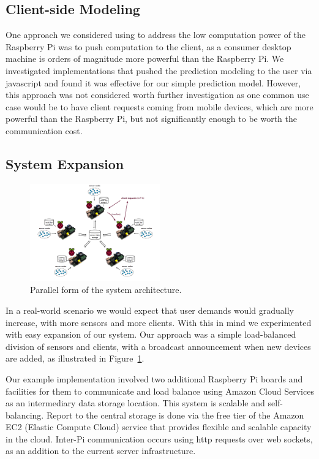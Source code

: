 \documentclass[a4paper]{acm_proc_article-sp}
\begin{document}
\subsection{Client-side Modeling}

One approach we considered using to address the low computation power of the Raspberry Pi was to push computation to the client, as a consumer desktop machine is orders of magnitude more powerful than the Raspberry Pi.  We investigated implementations that pushed the prediction modeling to the user via javascript and found it was effective for our simple prediction model.  However, this approach was not considered worth further investigation as one common use case would be to have client requests coming from mobile devices, which are more powerful than the Raspberry Pi, but not significantly enough to be worth the communication cost.

\subsection{System Expansion}

\begin{figure}
  \centering
      \includegraphics[width=0.5\textwidth]{architecture.png}
  \caption{\label{fig:parallel}Parallel form of the system architecture.}
\end{figure}

In a real-world scenario we would expect that user demands would gradually increase, with more sensors and more clients.  With this in mind we experimented with easy expansion of our system.  Our approach was a simple load-balanced division of sensors and clients, with a broadcast announcement when new devices are added, as illustrated in Figure~\ref{fig:parallel}.

Our example implementation involved two additional Raspberry Pi boards and facilities for them to communicate and load balance using Amazon Cloud Services as an intermediary data storage location.  This system is scalable and self-balancing.  Report to the central storage is done via the free tier of the Amazon EC2 (Elastic Compute Cloud) service that provides flexible and scalable capacity in the cloud.  Inter-Pi communication occurs using http requests over web sockets, as an addition to the current server infrastructure.
\end{document}
